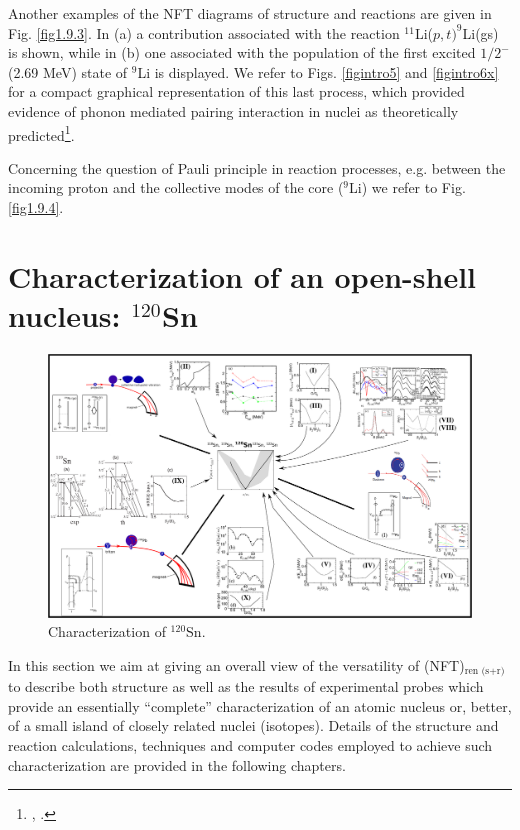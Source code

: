 Another examples of the NFT diagrams of structure and reactions are given in Fig. \ref{fig1.9.3}. In (a) a contribution associated with the reaction $^{11}$Li($p,t)^9$Li(gs) is shown, while in (b) one associated with the population of the first excited $1/2^-$ (2.69 MeV) state of $^9$Li is displayed.  We refer to Figs. \ref{figintro5} and \ref{figintro6x}   for a compact graphical representation of this last process, which provided evidence of phonon mediated pairing interaction in nuclei as theoretically predicted\footnote{\cite{Barranco:01}, \cite{Tanihata:08,Potel:10,Tanihata:13,Beceiro:15}.}.

          Concerning the question of Pauli principle in reaction processes, e.g.  between the incoming proton and the collective modes
          of the core ($^9$Li) we refer to Fig. \ref{fig1.9.4}. 
          
          
          
          
\section{Characterization of an open-shell nucleus: $^{120}$S\lowercase{n}}\label{S1.10}
          \begin{figure}
          \centerline {
          \includegraphics*[width=24cm, angle=90]{introduccion/figs/fig1_4_1v2}}
          \caption{ Characterization of $^{120}$Sn.}
          \label{fig1.4.1}
          \end{figure}
          In this section we aim at giving an overall view of
the versatility of (NFT)$_{\text{ren (s+r)}}$ to describe both structure as well as the results of experimental probes which provide an essentially ``complete'' characterization of an atomic nucleus or, better, of a small island of closely related nuclei (isotopes). Details of the structure and reaction calculations, techniques and computer codes employed to achieve such characterization are provided in the following chapters. 

